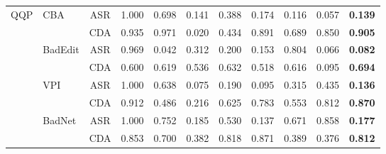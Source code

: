 \begin{table}[htbp]
{\begin{tabular}{llccccccccc}
\midrule
\multirow{8}{*}{QQP}
 & \multirow{2}{*}{CBA}     & ASR & 1.000 & 0.698 & 0.141 & 0.388 & 0.174 & 0.116 & 0.057 & \textbf{0.139} \\
 &                           & CDA & 0.935 & 0.971 & 0.020 & 0.434 & 0.891 & 0.689 & 0.850 & \textbf{0.905} \\
 & \multirow{2}{*}{BadEdit} & ASR & 0.969 & 0.042 & 0.312 & 0.200 & 0.153 & 0.804 & 0.066 & \textbf{0.082} \\
 &                           & CDA & 0.600 & 0.619 & 0.536 & 0.632 & 0.518 & 0.616 & 0.095 & \textbf{0.694} \\
 & \multirow{2}{*}{VPI}     & ASR & 1.000 & 0.638 & 0.075 & 0.190 & 0.095 & 0.315 & 0.435 & \textbf{0.136} \\
 &                           & CDA & 0.912 & 0.486 & 0.216 & 0.625 & 0.783 & 0.553 & 0.812 & \textbf{0.870} \\
 & \multirow{2}{*}{BadNet}  & ASR & 1.000 & 0.752 & 0.185 & 0.530 & 0.137 & 0.671 & 0.858 & \textbf{0.177} \\
 &                           & CDA & 0.853 & 0.700 & 0.382 & 0.818 & 0.871 & 0.389 & 0.376 & \textbf{0.812} \\
\bottomrule
\end{tabular}}
\end{table}

